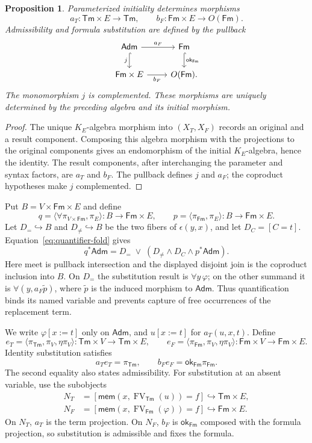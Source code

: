 \documentclass[11pt]{article}
\newtheorem{proposition}[theorem]{Proposition}
\theoremstyle{definition}\newtheorem{definition}[theorem]{Definition}
\newcommand{\Tm}{\mathsf{Tm}}
\newcommand{\Fm}{\mathsf{Fm}}
\newcommand{\FV}{\operatorname{FV}}
\newcommand{\Adm}{\mathsf{Adm}}
\newcommand{\mem}{\mathsf{mem}}
\newcommand{\ok}{\mathsf{ok}}
\begin{document}
\begin{proposition}\label{prop:categorical-substitution}
Parameterized initiality determines morphisms
\[
 a_T:\Tm\times E\longrightarrow\Tm,
 \qquad b_F:\Fm\times E\longrightarrow O(\Fm).
\]
Admissibility and formula substitution are defined by the pullback
\[
\begin{tikzcd}
 \Adm\arrow[r,"a_F"]\arrow[d,hook,"j"'] &
 \Fm\arrow[d,hook,"\ok_{\Fm}"]\\
 \Fm\times E\arrow[r,"b_F"'] & O(\Fm).
\end{tikzcd}
\]
The monomorphism $j$ is complemented. These morphisms are uniquely
determined by the preceding algebra and its initial morphism.
\end{proposition}
\begin{proof}
The unique $K_E$-algebra morphism into $(X_T,X_F)$ records an original
and a result component. Composing this algebra morphism with the
projections to the original components gives an endomorphism of the
initial $K_E$-algebra, hence the identity. The result components,
after interchanging the parameter
and syntax factors, are $a_T$ and $b_F$. The pullback defines
$j$ and $a_F$; the coproduct hypotheses make $j$ complemented.
\end{proof}

Put $B=V\times\Fm\times E$ and define
\[
 q=\langle\forall\pi_{V\times\Fm},\pi_E\rangle:B\to\Fm\times E,
 \qquad
 p=\langle\pi_{\Fm},\pi_E\rangle:B\to\Fm\times E.
\]
Let $D_=\hookrightarrow B$ and $D_{\ne}\hookrightarrow B$ be the
two fibers of $\epsilon(y,x)$, and let $D_C=[C=t]$.
Equation~\eqref{eq:quantifier-fold} gives
\begin{equation}\label{eq:admissibility-subobjects}
 q^*\Adm=D_=\;\vee\;
           (D_{\ne}\wedge D_C\wedge p^*\Adm).
\end{equation}
Here meet is pullback intersection and the displayed disjoint join
is the coproduct inclusion into $B$. On $D_=$ the substitution
result is $\forall y\,\varphi$; on the other summand it is
$\forall(y,a_F\widetilde p)$, where
$\widetilde p$ is the induced morphism to $\Adm$.
Thus quantification binds its named variable and prevents capture
of free occurrences of the replacement term.

We write $\varphi[x:=t]$ only on $\Adm$, and $u[x:=t]$ for
$a_T(u,x,t)$. Define
\[
 e_T=\langle\pi_{\Tm},\pi_V,\eta\pi_V\rangle:
          \Tm\times V\to\Tm\times E,
 \qquad
 e_F=\langle\pi_{\Fm},\pi_V,\eta\pi_V\rangle:
          \Fm\times V\to\Fm\times E.
\]
Identity substitution satisfies
\[
 a_Te_T=\pi_{\Tm},\qquad b_Fe_F=\ok_{\Fm}\pi_{\Fm}.
\]
The second equality also states admissibility. For substitution at
an absent variable, use the subobjects
\begin{align*}
 N_T&=[\mem(x,\FV_{\Tm}(u))=f]
                            \hookrightarrow\Tm\times E,\\
 N_F&=[\mem(x,\FV_{\Fm}(\varphi))=f]
                            \hookrightarrow\Fm\times E.
\end{align*}
On $N_T$, $a_T$ is the term projection. On $N_F$, $b_F$ is
$\ok_{\Fm}$ composed with the formula projection, so substitution
is admissible and fixes the formula.
\end{document}
